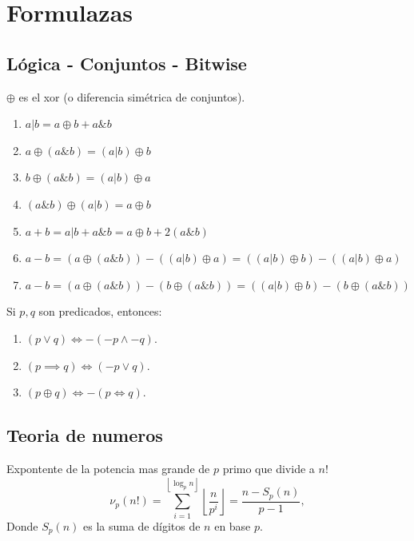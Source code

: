 \section{Formulazas}

\subsection{Lógica - Conjuntos - Bitwise}
$\oplus$ es el xor (o diferencia simétrica de conjuntos).
\begin{enumerate}[1., nosep]
    \item $a|b = a\oplus b + a \& b$
    \item $a\oplus (a\&b) = (a|b)\oplus b$
    \item $b\oplus (a\&b) = (a|b)\oplus a$
    \item $(a\&b)\oplus (a|b) = a\oplus b$
    \item $a + b = a|b + a\&b = a\oplus b + 2(a\&b)$
    \item $a - b = (a\oplus (a\&b))-((a|b)\oplus a) = ((a|b)\oplus b)-((a|b)\oplus a)$
    \item $a - b = (a\oplus (a\&b))-(b\oplus (a\&b)) = ((a|b)\oplus b)-(b\oplus (a\&b))$
\end{enumerate}

Si $p, q$ son predicados, entonces:
\begin{enumerate}[1., nosep]
    \item $(p \vee q) \iff -(-p \wedge -q)$.
    \item $(p \implies q) \iff (-p \vee q)$.
    \item $(p \oplus q) \iff -(p \iff q)$.
\end{enumerate}

\subsection{Teoria de numeros}
Expontente de la potencia mas grande de $p$ primo que divide a $n!$
\newcommand{\piso}[1]{\left\lfloor#1\right\rfloor}
\begin{equation*}
    \nu_p ( n! ) = \sum_{i=1}^{\piso{ \log_p n } } \piso{\frac{n}{ p^i }}
     = \frac{n - S_p(n)}{p - 1},
\end{equation*}
Donde $S_p(n)$ es la suma de dígitos de $n$ en base $p$.

